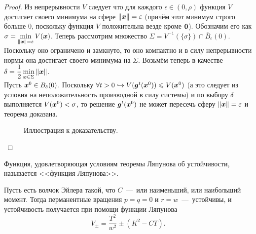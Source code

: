 \begin{proof}
    Из непрерывности $V$ следует что для каждого $\epsilon \in (0, \rho)$ функция $V$ достигает своего минимума на сфере $\|\boldsymbol{x}\| = \varepsilon$ (причём этот минимум строго больше 0, поскольку функция $V$ положительна везде кроме $\boldsymbol{0}$).
    Обозначим его как $\sigma = \min\limits_{\|\boldsymbol{x}\| = \varepsilon} V(\boldsymbol{x})$.
    Теперь рассмотрим множество $\Sigma = V^{-1}(\{\sigma\}) \cap \overline{B}_\epsilon(0)$.
    Поскольку оно ограничено и замкнуто, то оно компактно и в силу непрерывности нормы она достигает своего минимума на $\Sigma$.
    Возьмём теперь в качестве $\delta = \dfrac{1}{2}\min\limits_{\boldsymbol{x} \in \Sigma} \|\boldsymbol{x}\|$. \\
    Пусть $\boldsymbol{x}^{0} \in B_\delta(0)$.
    Поскольку $\forall t > 0 \hookrightarrow V(\boldsymbol{g}^t(\boldsymbol{x}^0)) \leqslant V(\boldsymbol{x}^0)$ (а это следует из условия на неположительность производной в силу системы) и по выбору $\delta$ выполняется $V(\boldsymbol{x}^0) < \sigma$, то решение $\boldsymbol{g}^t(\boldsymbol{x}^0)$ не может пересечь сферу $\|\boldsymbol{x}\| = \varepsilon$ и теорема доказана.
    \begin{figure}[h!]
        \begin{center}
        \end{center}
        \caption{Иллюстрация к доказательству.}
    \end{figure}
\end{proof}
\begin{note}
    Функция, удовлетворяющая условиям теоремы Ляпунова об устойчивости, называется <<функция Ляпунова>>.
\end{note}
\begin{example}
    Пусть есть волчок Эйлера такой, что $C$~---~или наименьший, или наибольший момент.
    Тогда перманентные вращения $p = q = 0$ и $r = w$~---~устойчивы, и устойчивость получается при помощи функции Ляпунова
    \[
        V_{\pm} = \dfrac{T^2}{w^2} \pm (K^2 - CT).
    \]
\end{example}
